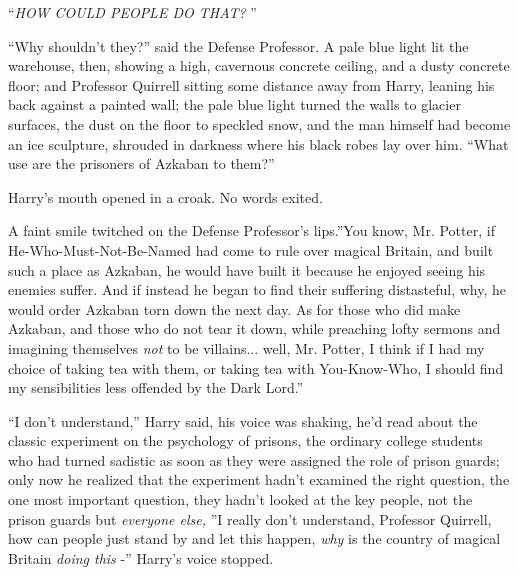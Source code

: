 ``\emph{HOW COULD PEOPLE DO THAT?} ''

``Why shouldn't they?'' said the Defense Professor. A pale blue light
lit the warehouse, then, showing a high, cavernous concrete ceiling, and
a dusty concrete floor; and Professor Quirrell sitting some distance
away from Harry, leaning his back against a painted wall; the pale blue
light turned the walls to glacier surfaces, the dust on the floor to
speckled snow, and the man himself had become an ice sculpture, shrouded
in darkness where his black robes lay over him. ``What use are the
prisoners of Azkaban to them?''

Harry's mouth opened in a croak. No words exited.

A faint smile twitched on the Defense Professor's lips.''You know, Mr.
Potter, if He-Who-Must-Not-Be-Named had come to rule over magical
Britain, and built such a place as Azkaban, he would have built it
because he enjoyed seeing his enemies suffer. And if instead he began to
find their suffering distasteful, why, he would order Azkaban torn down
the next day. As for those who did make Azkaban, and those who do not
tear it down, while preaching lofty sermons and imagining themselves
\emph{not} to be villains... well, Mr. Potter, I think if I had my
choice of taking tea with them, or taking tea with You-Know-Who, I
should find my sensibilities less offended by the Dark Lord.''

``I don't understand,'' Harry said, his voice was shaking, he'd read
about the classic experiment on the psychology of prisons, the ordinary
college students who had turned sadistic as soon as they were assigned
the role of prison guards; only now he realized that the experiment
hadn't examined the right question, the one most important question,
they hadn't looked at the key people, not the prison guards but
\emph{everyone else,} ''I really don't understand, Professor Quirrell,
how can people just stand by and let this happen, \emph{why} is the
country of magical Britain \emph{doing this} -'' Harry's voice stopped.

